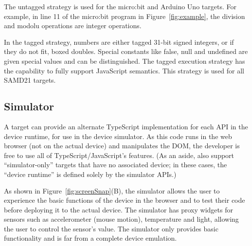 The untagged strategy is used for the micro:bit and Arduino Uno targets. For example,
in line 11 of the micro:bit program in Figure~\ref{fig:example}, the division and modolu 
operations are integer operations. 

In the tagged strategy, numbers are either tagged 31-bit signed integers, or if they do not fit, 
boxed doubles. Special constants like false, null and undefined are given special values 
and can be distinguished. The tagged execution strategy has the capability to fully support
JavaScript semantics. This strategy is used for all SAMD21 targets.

\subsection{Simulator}

A \MC target can provide an alternate TypeScript implementation for each API in the device runtime, for use in the device
simulator. As this code runs in the web browser (not on the actual device) and manipulates the DOM, the developer is free to
use all of TypeScript/JavaScript's features. (As an aside, \MC also support ``simulator-only'' targets that have no 
associated device; in these cases, the ``device runtime'' is defined solely by the simulator APIs.) 

As shown in Figure~\ref{fig:screenSnap}(B), the simulator allows the user to experience the basic functions of the device 
in the browser and to test their code
before deploying it to the actual device. The simulator has proxy widgets for sensors such as accelerometer (mouse motion),
temperature and light, allowing the user to control the sensor's value.  The simulator only provides basic functionality
and is far from a complete device emulation.  


